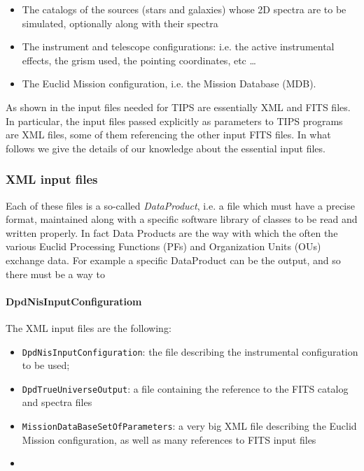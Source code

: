 \begin{itemize}
\item The catalogs of the sources (stars and galaxies) whose 2D spectra are to be simulated, optionally along with their spectra
\item The instrument and telescope configurations: i.e. the active instrumental effects, the grism used, the pointing coordinates, etc \dots
\item The Euclid Mission configuration, i.e. the Mission Database (MDB).
\end{itemize}

As shown in  the input files needed for TIPS are essentially XML and FITS files. In particular, the input files passed explicitly as  parameters to TIPS programs are XML files, some of them referencing the other input FITS files. In what follows we give the details of our knowledge about the essential input files.

\subsubsection{XML input files}
Each of these files is a so-called \emph{DataProduct}, i.e. a file which must have a precise format, maintained along with a specific software library of classes to be read and written properly. In fact Data Products are the way with which the often the various Euclid Processing Functions (PFs) and Organization Units (OUs) exchange data. For example a specific DataProduct can be the output, and so there must be a way to 


\paragraph{DpdNisInputConfiguratiom}

The XML input files are the following:

\begin{itemize}
\item \verb+DpdNisInputConfiguration+: the file describing the instrumental configuration to be used;
\item \verb+DpdTrueUniverseOutput+: a file containing the reference to the FITS catalog and spectra files
\item \verb+MissionDataBaseSetOfParameters+: a very big XML file describing the Euclid Mission configuration, as well as many references to FITS input files
\item \verb++
\end{itemize}
